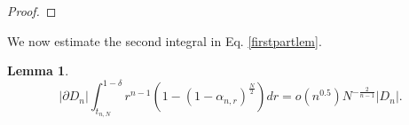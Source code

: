 \documentclass[10pt, twoside, leqno]{article}
\newtheorem{lemma}[thm]{Lemma}
\theoremstyle{definition}
\numberwithin{equation}{section}
\newcommand{\E}{{\mathbb{E}}}
\newcommand{\R}{\mathbb{R}}
\newcommand\inner[2]{|\langle #1, #2 \rangle|}
\newcommand\inneri[2]{\langle #1, #2 \rangle}
\newcommand{\NN}{N^{-\frac 2{n-1} }}
\begin{document}
\begin{proof}
%	
%
\end{proof}
We now estimate the second integral in Eq. \eqref{firstpartlem}.
\begin{lemma}
	\[
	|\partial D_n|\int_{t_{n,N}}^{1-\delta}r^{n-1}\left(1-\left(1-\alpha_{n,r}\right)^{\frac{N}{2}}\right)dr = o(n^{0.5})\NN|D_n|.
	\]
\end{lemma}
\end{document}
